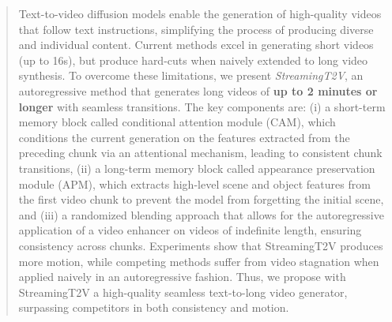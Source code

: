 \begin{abstract}
    Text-to-video diffusion models enable the generation of high-quality videos that follow text instructions, simplifying the process of producing diverse and individual content.
    Current methods excel in generating short videos (up to 16s), but produce hard-cuts when naively extended to long video synthesis.
    To overcome these limitations, we present \textit{StreamingT2V}, an autoregressive method that generates long videos of \textbf{up to 2 minutes or longer} with seamless transitions.
    The key components are:
    (i) a short-term memory block called conditional attention module (CAM), which conditions the current generation on the features extracted from the preceding chunk via an attentional mechanism, leading to consistent chunk transitions, 
    (ii) a long-term memory block called appearance preservation module (APM), which extracts high-level scene and object features from the first video chunk to prevent the model from forgetting the initial scene,  and (iii) a randomized blending approach that allows for the autoregressive application of a video enhancer on videos of indefinite length, ensuring consistency across chunks. 
    Experiments show that StreamingT2V produces more motion, while competing methods suffer from video stagnation when applied naively in an autoregressive fashion.
    Thus, we propose with StreamingT2V a high-quality seamless text-to-long video generator, surpassing competitors in both consistency and motion. 
\end{abstract}